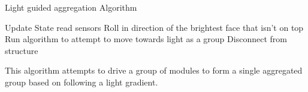 \begin{algorithm}[htbp] 
	\caption{Light guided aggregation Algorithm}
	\label{algorithmAggregate}
	\SetAlgoLined
	{
		Update State read sensors\;
		{
			Roll in direction of the brightest face that isn't on top\;
		}
		{
			Run algorithm to attempt to move towards light as a group\;
		}
		{
			Disconnect from structure
		}
	}
	\caption{This algorithm attempts to drive a group of modules to form a single aggregated group based on following a light gradient.}
	
\end{algorithm}


%
%
%

%
%	
%	
